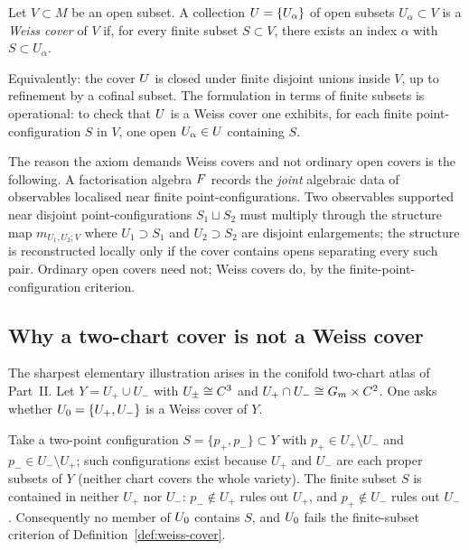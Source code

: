 \begin{definition}
\label{def:weiss-cover}
Let $V \subset M$ be an open subset. A collection $U = \{U_\alpha\}$
of open subsets $U_\alpha \subset V$ is a \emph{Weiss cover} of $V$ if,
for every finite subset $S \subset V$, there exists an index $\alpha$
with $S \subset U_\alpha$.
\end{definition}

Equivalently: the cover $U$ is closed under finite disjoint unions
inside $V$, up to refinement by a cofinal subset. The formulation in
terms of finite subsets is operational: to check that $U$ is a Weiss
cover one exhibits, for each finite point-configuration $S$ in $V$,
one open $U_\alpha \in U$ containing $S$.

The reason the axiom demands Weiss covers and not ordinary open covers
is the following. A factorisation algebra $F$ records the \emph{joint}
algebraic data of observables localised near finite point-configurations.
Two observables supported near disjoint point-configurations $S_1 \sqcup
S_2$ must multiply through the structure map $m_{U_1, U_2; V}$ where
$U_1 \supset S_1$ and $U_2 \supset S_2$ are disjoint enlargements; the
structure is reconstructed locally only if the cover contains opens
separating every such pair. Ordinary open covers need not; Weiss covers
do, by the finite-point-configuration criterion.

\subsection{Why a two-chart cover is not a Weiss cover}
\label{subsec:two-chart-not-weiss}

The sharpest elementary illustration arises in the conifold two-chart
atlas of Part~II. Let $Y = U_+ \cup U_-$ with $U_\pm \cong C^3$ and
$U_+ \cap U_- \cong G_m \times C^2$. One asks whether $U_0 = \{U_+,
U_-\}$ is a Weiss cover of $Y$.

Take a two-point configuration $S = \{p_+, p_-\} \subset Y$ with
$p_+ \in U_+ \setminus U_-$ and $p_- \in U_- \setminus U_+$; such
configurations exist because $U_+$ and $U_-$ are each proper subsets
of $Y$ (neither chart covers the whole variety). The finite subset
$S$ is contained in neither $U_+$ nor $U_-$: $p_- \notin U_+$ rules out
$U_+$, and $p_+ \notin U_-$ rules out $U_-$. Consequently no member of
$U_0$ contains $S$, and $U_0$ fails the finite-subset criterion of
Definition~\ref{def:weiss-cover}.

